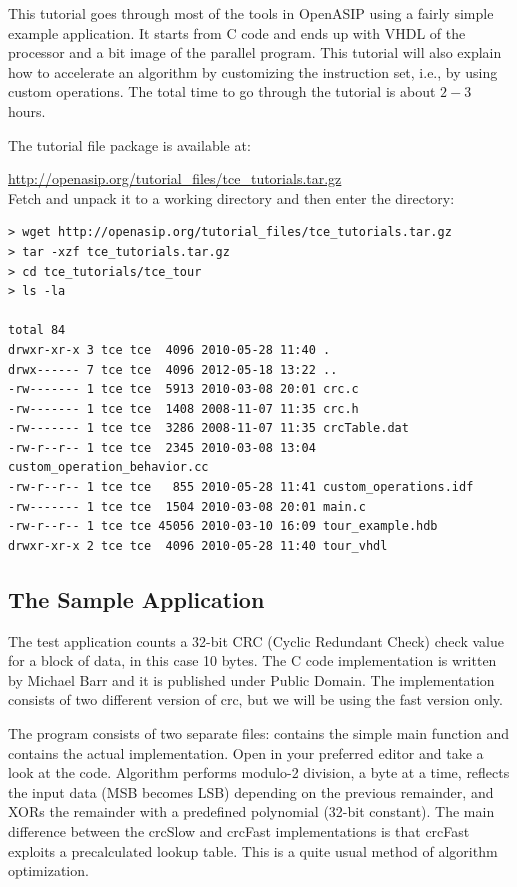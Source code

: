 \documentclass[a4paper,twoside]{tceusermanual}
\begin{document}
This tutorial goes through most of the tools in OpenASIP using a fairly simple
example application. It starts from C code and ends up with VHDL of the
processor and a bit image of the parallel program. This tutorial will also
explain how to accelerate an algorithm by customizing the instruction
set, i.e., by using custom operations. The total time to go through
the tutorial is about $2-3$ hours.

The tutorial file package is available at:

\url{http://openasip.org/tutorial_files/tce_tutorials.tar.gz}\\

Fetch and unpack it to a working directory and then enter the directory:

\begin{verbatim}
> wget http://openasip.org/tutorial_files/tce_tutorials.tar.gz
> tar -xzf tce_tutorials.tar.gz
> cd tce_tutorials/tce_tour
> ls -la

total 84
drwxr-xr-x 3 tce tce  4096 2010-05-28 11:40 .
drwx------ 7 tce tce  4096 2012-05-18 13:22 ..
-rw------- 1 tce tce  5913 2010-03-08 20:01 crc.c
-rw------- 1 tce tce  1408 2008-11-07 11:35 crc.h
-rw------- 1 tce tce  3286 2008-11-07 11:35 crcTable.dat
-rw-r--r-- 1 tce tce  2345 2010-03-08 13:04 custom_operation_behavior.cc
-rw-r--r-- 1 tce tce   855 2010-05-28 11:41 custom_operations.idf
-rw------- 1 tce tce  1504 2010-03-08 20:01 main.c
-rw-r--r-- 1 tce tce 45056 2010-03-10 16:09 tour_example.hdb
drwxr-xr-x 2 tce tce  4096 2010-05-28 11:40 tour_vhdl
\end{verbatim}


\subsection{The Sample Application}

The test application counts a 32-bit CRC (Cyclic Redundant Check)
check value for a block of data, in this case 10 bytes. The C code
implementation is written by Michael Barr and it is published under
Public Domain. The implementation consists of two different version of
crc, but we will be using the fast version only.

The program consists of two separate files:  contains the
simple main function and  contains the actual
implementation. Open  in your preferred editor and take a
look at the code. Algorithm performs modulo-2 division, a byte at a
time, reflects the input data (MSB becomes LSB) depending on the
previous remainder, and XORs the remainder with a predefined
polynomial (32-bit constant). The main difference between the crcSlow
and crcFast implementations is that crcFast exploits a precalculated
lookup table. This is a quite usual method of algorithm optimization.
\end{document}
